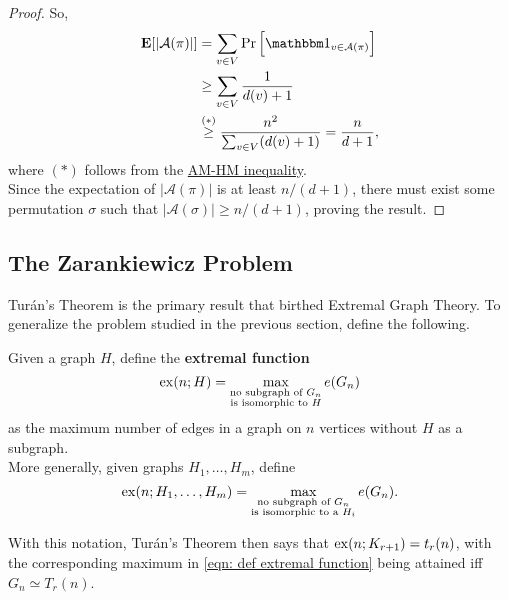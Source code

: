 \begin{proof}
			So,
			\begin{align*}
				\expec[ |\mathcal{A}(\pi)| ] &= \sum_{v \in V} \Pr\left[ \indic_{v \in \mathcal{A}(\pi)} \right] \\
				&\ge \sum_{v \in V} \frac{1}{d(v) + 1} \\
				&\stackrel{(*)}{\ge} \frac{n^2}{\sum_{v \in V} (d(v) + 1)} = \frac{n}{d+1},
			\end{align*}
			where $(*)$ follows from the \href{https://en.wikipedia.org/wiki/HM-GM-AM-QM_inequalities}{AM-HM inequality}.\\
			Since the expectation of $|\mathcal{A}(\pi)|$ is at least $n/(d+1)$, there must exist some permutation $\sigma$ such that $|\mathcal{A}(\sigma)| \ge n/(d+1)$, proving the result.
		\end{proof}

	\subsection{The Zarankiewicz Problem}

		Tur\'{a}n's Theorem is the primary result that birthed Extremal Graph Theory. To generalize the problem studied in the previous section, define the following.

		\begin{fdef}
			Given a graph $H$, define the \textbf{extremal function}
			\begin{equation}
				\label{eqn: def extremal function}
				\operatorname{ex}(n;H) = \max_{\substack{\text{no subgraph of }G_n \\\text{is isomorphic to }H}} e(G_n)
			\end{equation}
			as the maximum number of edges in a graph on $n$ vertices without $H$ as a subgraph.\\
			More generally, given graphs $H_1,\ldots,H_m$, define
			\[ \operatorname{ex}(n;H_1,\ldots,H_m) = \max_{\substack{\text{no subgraph of }G_n \\\text{is isomorphic to a }H_i}} e(G_n). \]	
		\end{fdef}

		With this notation, Tur\'{a}n's Theorem then says that $\operatorname{ex}(n;K_{r+1}) = t_r(n)$, with the corresponding maximum in \eqref{eqn: def extremal function} being attained iff $G_n \simeq T_r(n)$.

